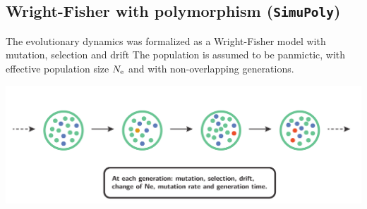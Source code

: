\documentclass{article}
\begin{document}
	\begin{table}[H]
		\centering
		\noindent{}
		\caption[Inferred amino-acids entropy for \texttt{SimuDiv}]{
		Estimated amino-acid entropy under simulations accounting for long term fluctuation of $\Ne$, mutation rate per generation and generation time.
		Estimation is obtained with the mechanistic inference model developed in this paper of site-specific amino-acid fitness profiles and log-Brownian process for $\Ne$, $\mu$ and life-history traits (in the left column), or under the assumption of constant $\Ne$ (in the right column).
		}
	\end{table}

	\subsection{Wright-Fisher with polymorphism (\texttt{SimuPoly})}
	\label{subsec:wright-fisher-with-polymorphism}

	The evolutionary dynamics was formalized as a Wright-Fisher model with mutation, selection and drift
	The population is assumed to be panmictic, with {effective population size} $\Ne$ and with non-overlapping generations.

	\begin{center}
		\includegraphics[width=\textwidth] {ModelSimuPoly}
	\end{center}
\end{document}

